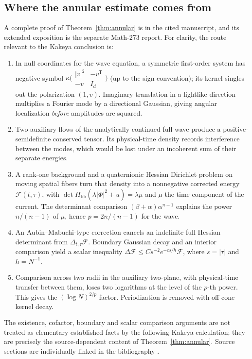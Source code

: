 \documentclass[11pt,a4paper]{article}
\numberwithin{equation}{section}
\theoremstyle{definition}
\theoremstyle{remark}
\begin{document}
\subsection{Where the annular estimate comes from}
A complete proof of Theorem~\ref{thm:annular} is in the cited
manuscript, and its extended exposition is the separate Math-273
report. For clarity, the route relevant to the Kakeya conclusion is:
\begin{enumerate}[label=(\roman*)]
\item In null coordinates for the wave equation, a symmetric
first-order system has negative symbol
$\kappa\bigl(\begin{smallmatrix}|v|^2&-v^{\mathsf T}\\-v&I_d\end{smallmatrix}\bigr)$
(up to the sign convention); its kernel singles out the polarization
$(1,v)$. Imaginary translation in a lightlike direction multiplies a
Fourier mode by a directional Gaussian, giving angular localization
\emph{before} amplitudes are squared.
\item Two auxiliary flows of the analytically continued full wave
produce a positive-semidefinite conserved tensor. Its physical-time
density records interference between the modes, which would be lost
under an incoherent sum of their separate energies.
\item A rank-one background and a quaternionic Hessian Dirichlet
problem on moving spatial fibers turn that density into a
nonnegative corrected energy $\mathcal F(t,\tau)$, with
$\det H_{\mathrm{fib}}(\lambda|\Phi|^2+u)=\lambda\mu$ and
$\mu$ the time component of the current. The determinant comparison
$(\beta+\alpha)\alpha^{n-1}$ explains the power $n/(n-1)$ of
$\mu$, hence $p=2n/(n-1)$ for the wave.
\item An Aubin--Mabuchi-type correction cancels an indefinite full
Hessian determinant from $\Delta_{t,\tau}\mathcal F$. Boundary
Gaussian decay and an interior comparison yield a scalar inequality
$\Delta\mathcal F\le Cs^{-2}e^{-cs/h}\mathcal F$, where
$s=|\tau|$ and $h=N^{-1}$.
\item Comparison across two radii in the auxiliary two-plane, with
physical-time transfer between them, loses two logarithms at the
level of the $p$-th power. This gives the $(\log N)^{2/p}$ factor.
Periodization is removed with off-cone kernel decay.
\end{enumerate}
The existence, cofactor, boundary and scalar comparison arguments are
not treated as elementary established facts by the following Kakeya
calculation; they are precisely the source-dependent content of
Theorem~\ref{thm:annular}. Source sections are individually linked in
the bibliography \cite{current,calculus,energy,barrier,propagation}.
\end{document}
